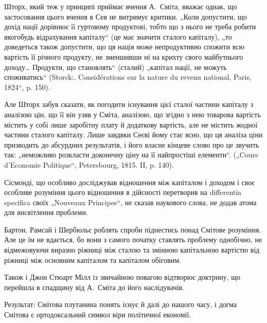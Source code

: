 
Шторх, який теж у принципі приймає вчення А.~Сміта, вважає однак,
що застосовання цього вчення в Сея не витримує критики. „Коли
допустити, що дохід нації дорівнює її гуртовому продуктові, тобто що з
нього не треба робити якогобудь відрахування капіталу“ (це має значити
сталого капіталу), „то доведеться також допустити, що ця нація може
непродуктивно спожити всю вартість її річного продукту, не зменшивши
ні на крихту свого майбутнього доходу\dots{} Продукти, що становлять“
(сталий) „капітал нації, не можуть споживатись“ (Storck:. Considérations
sur la nature du revenu national, Paris, 1824“, p. 150).

Але Шторх забув сказати, як погодити існування цієї сталої частини
капіталу з аналізою цін, що її він узяв у Сміта, аналізою, що згідно з
нею товарова вартість містить у собі лише заробітну плату й додаткову
вартість, але не містить жодної частини сталого капіталу. Лише завдяки
Сеєві йому стає ясно, що ця аналіза ціни призводить до абсурдних
результатів, і його власне кінцеве слово про це звучить так: „неможливо
розкласти доконечну ціну на її найпростіші елементи“. („Cours d’Economie
Politique“, Petersbourg, 1815. II, p. 140).

Сісмонді, що особливо досліджував відношення між капіталом і доходом
і своє особливе розуміння цього відношення в дійсності перетворив
на differentia specifica своїх „Nouveaux Principes“, не сказав 
наукового слова, не додав  атома для висвітлення проблеми.

Бартон, Рамсай і Шербюльє роблять спроби піднестись понад Смітове
розуміння. Але це їм не вдається, бо вони з самого початку ставлять
проблему однобічно, не відмежовуючи виразно ріжниці між сталою
та змінною капітальною вартістю від ріжниці між основним капіталом та
капіталом обіговим.

Також і Джон Стюарт Мілл із звичайною повагою відтворює доктрину,
що перейшла в спадщину від А.~Сміта до його наслідувачів.

Результат: Смітова плутанина понять існує й далі до нашого часу, і
догма Смітова є ортодоксальний символ віри політичної економії.
\label{original-300-1}


